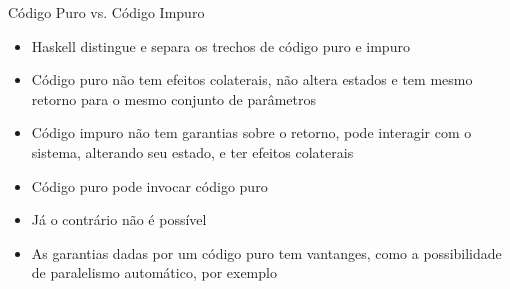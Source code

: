 \begin{frame}[fragile]{Código Puro vs. Código Impuro}

    \begin{itemize}
        \item Haskell distingue e separa os trechos de código puro e impuro

        \item Código puro não tem efeitos colaterais, não altera estados e tem mesmo retorno
            para o mesmo conjunto de parâmetros

        \item Código impuro não tem garantias sobre o retorno, pode interagir com o sistema,
            alterando seu estado, e ter efeitos colaterais

        \item Código puro pode invocar código puro

        \item Já o contrário não é possível

        \item As garantias dadas por um código puro tem vantanges, como a possibilidade de
            paralelismo automático, por exemplo
    \end{itemize}

\end{frame}
